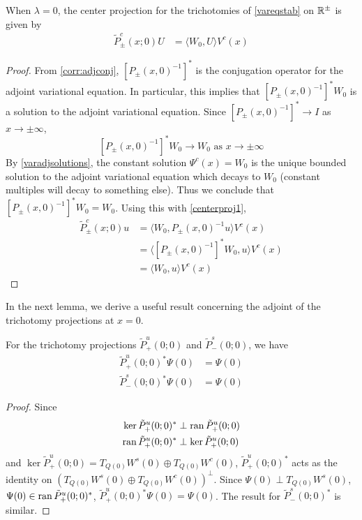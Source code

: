 \documentclass[thesis.tex]{subfiles}
\begin{document}
\begin{lemma}\label{centerprojlemma}
When $\lambda = 0$, the center projection for the trichotomies of \cref{vareqstab} on $\mathbb{R}^\pm$ is given by 
\begin{align}\label{centerproj}
\tilde{P}^c_\pm(x; 0) U &= \langle W_0, U \rangle V^c(x)
\end{align}
\begin{proof}
From \cref{corr:adjconj}, $[P_\pm(x, 0)^{-1}]^*$ is the conjugation operator for the adjoint variational equation. In particular, this implies that $[P_\pm(x, 0)^{-1}]^* W_0$ is a solution to the adjoint variational equation. Since $[P_\pm(x, 0)^{-1}]^* \rightarrow I$ as $x \rightarrow \pm \infty$, 
\[
[P_\pm(x, 0)^{-1}]^* W_0 \rightarrow W_0 \text{ as }x \rightarrow \pm \infty
\]
By \cref{varadjsolutions}, the constant solution $\Psi^c(x) = W_0$ is the unique bounded solution to the adjoint variational equation which decays to $W_0$ (constant multiples will decay to something else). Thus we conclude that $[P_\pm(x, 0)^{-1}]^* W_0 = W_0$. Using this with \cref{centerproj1},
\begin{align*}
\tilde{P}^c_\pm(x; 0) u 
&= \langle W_0, P_\pm(x, 0)^{-1} u \rangle V^c(x) \\
&= \langle [P_\pm(x, 0)^{-1}]^*W_0, u \rangle V^c(x) \\
&= \langle W_0, u \rangle V^c(x) 
\end{align*}
\end{proof}
\end{lemma}

In the next lemma, we derive a useful result concerning the adjoint of the trichotomy projections at $x = 0$.

\begin{lemma}\label{lemma:trichadjoint}
For the trichotomy projections $\tilde{P}_+^u(0; 0)$ and $\tilde{P}_-^s(0; 0)$, we have
\begin{equation}
\begin{aligned}
\tilde{P}_+^u(0; 0)^* \Psi(0) &= \Psi(0) \\
\tilde{P}_-^s(0; 0)^* \Psi(0) &= \Psi(0)
\end{aligned}
\end{equation}
\begin{proof}
Since
\begin{align*}
\mathop\mathrm{ker}\nolimits \tilde{P}_+^u(0; 0)^* &\perp \operatorname{ran} \tilde{P}_+^u(0; 0) \\
\operatorname{ran} \tilde{P}_+^u(0; 0)^* &\perp \mathop\mathrm{ker}\nolimits \tilde{P}_+^u(0; 0)
\end{align*}
and $\ker \tilde{P}_+^u(0; 0) = T_{Q(0)} W^s(0) \oplus T_{Q(0)} W^c(0)$, $\tilde{P}_+^u(0; 0)^*$ acts as the identity on $(T_{Q(0)} W^s(0) \oplus T_{Q(0)} W^c(0))^\perp$. Since $\Psi(0) \perp T_{Q(0)} W^s(0)$, $\Psi(0) \in \operatorname{ran} \tilde{P}_+^u(0; 0)^*$, $\tilde{P}_+^u(0; 0)^* \Psi(0) = \Psi(0)$. The result for $\tilde{P}_-^s(0; 0)^*$ is similar.
\end{proof}
\end{lemma}
\end{document}
